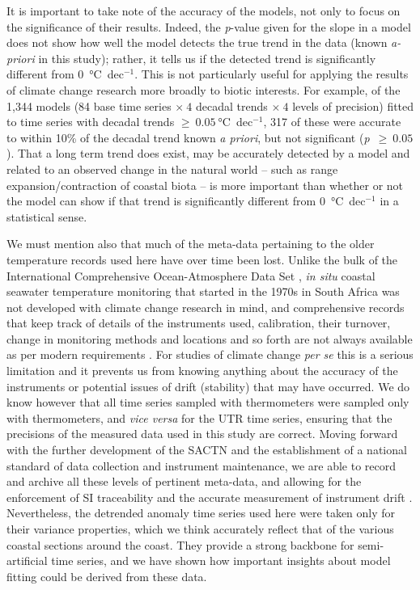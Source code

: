 \documentclass[]{ametsoc}
\begin{document}
It is important to take note of the accuracy of the models, not only to focus on the significance of their results. Indeed, the \emph{p}-value given for the slope in a model does not show how well the model detects the true trend in the data (known \emph{a-priori} in this study); rather, it tells us if the detected trend is significantly different from \SI{0}{\degreeCelsius}~dec$^{-1}$. This is not particularly useful for applying the results of climate change research more broadly to biotic interests. For example, of the 1,344 models (84 base time series $\times~4$ decadal trends $\times~4$ levels of precision) fitted to time series with decadal trends $\geq~\SI{0.05}{\degreeCelsius}$~dec$^{-1}$, 317 of these  were accurate to within 10\% of the decadal trend known \emph{a priori}, but not significant (\emph{p}~$\geq~0.05$). That a long term trend does exist, may be accurately detected by a model and related to an observed change in the natural world -- such as range expansion/contraction of coastal biota \citep{Bolton2012,Straub2016,Wernberg2016} -- is more important than whether or not the model can show if that trend is significantly different from \SI{0}{\degreeCelsius}~dec$^{-1}$ in a statistical sense.

We must mention also that much of the meta-data pertaining to the older temperature records used here have over time been lost. Unlike the bulk of the International Comprehensive Ocean-Atmosphere Data Set \citep[ICOADS;][]{Freeman:2016db}, \emph{in situ} coastal seawater temperature monitoring that started in the 1970s in South Africa was not developed with climate change research in mind, and comprehensive records that keep track of details of the instruments used, calibration, their turnover, change in monitoring methods and locations and so forth are not always available as per modern requirements \citep{Aguilar2003}. For studies of climate change \emph{per se} this is a serious limitation and it prevents us from knowing anything about the accuracy of the instruments or potential issues of drift (stability) that may have occurred. We do know however that all time series sampled with thermometers were sampled only with thermometers, and \emph{vice versa} for the UTR time series, ensuring that the precisions of the measured data used in this study are correct. Moving forward with the further development of the SACTN and the establishment of a national standard of data collection and instrument maintenance, we are able to record and archive all these levels of pertinent meta-data, and allowing for the enforcement of SI traceability and the accurate measurement of instrument drift \citep{Jarraud2008}. Nevertheless, the detrended anomaly time series used here were taken only for their variance properties, which we think accurately reflect that of the various coastal sections around the coast. They provide a strong backbone for semi-artificial time series, and we have shown how important insights about model fitting could be derived from these data.
\end{document}
